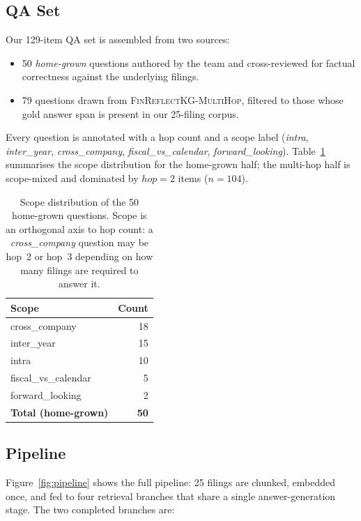 \documentclass[11pt]{article}
\begin{document}
\subsection{QA Set}
\label{sec:qa}
Our 129-item QA set is assembled from two sources:
\begin{itemize}
\itemsep 0pt \parskip 0pt
  \item 50 \textit{home-grown} questions authored by the team and
    cross-reviewed for factual correctness against the underlying
    filings.
  \item 79 questions drawn from \textsc{FinReflectKG-MultiHop}, filtered
    to those whose gold answer span is present in our 25-filing
    corpus.
\end{itemize}
Every question is annotated with a hop count and a scope label
(\textit{intra}, \textit{inter\_year}, \textit{cross\_company},
\textit{fiscal\_vs\_calendar}, \textit{forward\_looking}).
Table~\ref{tab:qa-scope} summarises the scope distribution for the
home-grown half; the multi-hop half is scope-mixed and dominated by
$hop=2$ items ($n=104$).

\begin{table}[h]
\centering
\small
\begin{tabular}{lr}
\toprule
Scope & Count \\
\midrule
cross\_company       & 18 \\
inter\_year          & 15 \\
intra                & 10 \\
fiscal\_vs\_calendar &  5 \\
forward\_looking     &  2 \\
\midrule
\textbf{Total (home-grown)} & \textbf{50} \\
\bottomrule
\end{tabular}
\caption{Scope distribution of the 50 home-grown questions.
Scope is an orthogonal axis to hop count: a \textit{cross\_company}
question may be hop~2 or hop~3 depending on how many filings are
required to answer it.}
\label{tab:qa-scope}
\end{table}

\subsection{Pipeline}
\label{sec:pipeline}
Figure~\ref{fig:pipeline} shows the full pipeline: 25 filings are
chunked, embedded once, and fed to four retrieval branches that share
a single answer-generation stage. The two completed branches are:
\end{document}
